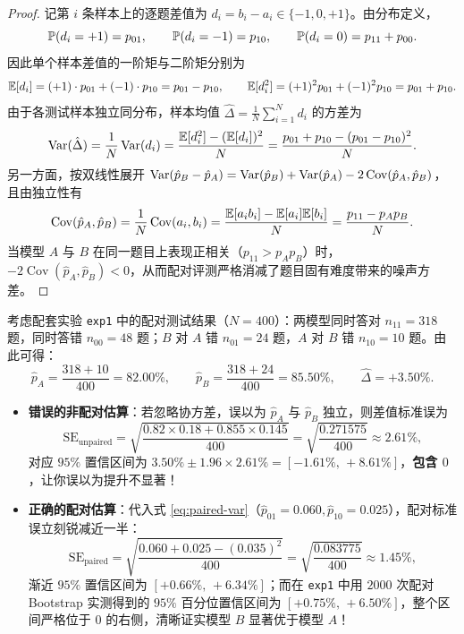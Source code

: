 \begin{proof}
记第 $i$ 条样本上的逐题差值为 $d_i = b_i - a_i \in \{-1, 0, +1\}$。由分布定义，
\[
  \mathbb{P}(d_i = +1) = p_{01}, \qquad \mathbb{P}(d_i = -1) = p_{10}, \qquad \mathbb{P}(d_i = 0) = p_{11} + p_{00}.
\]
因此单个样本差值的一阶矩与二阶矩分别为
\[
  \mathbb{E}[d_i] = (+1)\cdot p_{01} + (-1)\cdot p_{10} = p_{01} - p_{10}, \qquad
  \mathbb{E}[d_i^2] = (+1)^2 p_{01} + (-1)^2 p_{10} = p_{01} + p_{10}.
\]
由于各测试样本独立同分布，样本均值 $\hat{\Delta} = \frac{1}{N}\sum_{i=1}^N d_i$ 的方差为
\[
  \operatorname{Var}(\hat{\Delta}) = \frac{1}{N}\operatorname{Var}(d_i) = \frac{\mathbb{E}[d_i^2] - (\mathbb{E}[d_i])^2}{N} = \frac{p_{01} + p_{10} - (p_{01} - p_{10})^2}{N}.
\]
另一方面，按双线性展开 $\operatorname{Var}(\hat{p}_B - \hat{p}_A) = \operatorname{Var}(\hat{p}_B) + \operatorname{Var}(\hat{p}_A) - 2\operatorname{Cov}(\hat{p}_A, \hat{p}_B)$，且由独立性有
\[
  \operatorname{Cov}(\hat{p}_A, \hat{p}_B)
  = \frac{1}{N}\operatorname{Cov}(a_i, b_i)
  = \frac{\mathbb{E}[a_i b_i] - \mathbb{E}[a_i]\mathbb{E}[b_i]}{N}
  = \frac{p_{11} - p_A p_B}{N}.
\]
当模型 $A$ 与 $B$ 在同一题目上表现正相关（$p_{11} > p_A p_B$）时，$-2\operatorname{Cov}(\hat{p}_A,\hat{p}_B) < 0$，从而配对评测严格消减了题目固有难度带来的噪声方差。
\end{proof}

\begin{example}[非配对误差棒为何会误杀真实提升？]\label{ex:paired-vs-unpaired}
考虑配套实验 \texttt{exp1} 中的配对测试结果（$N=400$）：两模型同时答对 $n_{11}=318$ 题，同时答错 $n_{00}=48$ 题；$B$ 对 $A$ 错 $n_{01}=24$ 题，$A$ 对 $B$ 错 $n_{10}=10$ 题。由此可得：
\[
  \hat{p}_A = \frac{318 + 10}{400} = 82.00\%, \qquad
  \hat{p}_B = \frac{318 + 24}{400} = 85.50\%, \qquad
  \hat{\Delta} = +3.50\%.
\]
\begin{itemize}
  \item \textbf{错误的非配对估算}：若忽略协方差，误以为 $\hat{p}_A$ 与 $\hat{p}_B$ 独立，则差值标准误为
  \[
    \mathrm{SE}_{\text{unpaired}} = \sqrt{\frac{0.82\times 0.18 + 0.855\times 0.145}{400}} = \sqrt{\frac{0.271575}{400}} \approx 2.61\%,
  \]
  对应 $95\%$ 置信区间为 $3.50\% \pm 1.96 \times 2.61\% = [-1.61\%,\, +8.61\%]$，\textbf{包含 $0$}，让你误以为提升不显著！
  \item \textbf{正确的配对估算}：代入式 \eqref{eq:paired-var}（$\hat{p}_{01}=0.060, \hat{p}_{10}=0.025$），配对标准误立刻锐减近一半：
  \[
    \mathrm{SE}_{\text{paired}} = \sqrt{\frac{0.060 + 0.025 - (0.035)^2}{400}} = \sqrt{\frac{0.083775}{400}} \approx 1.45\%,
  \]
  渐近 $95\%$ 置信区间为 $[+0.66\%,\, +6.34\%]$；而在 \texttt{exp1} 中用 $2000$ 次配对 Bootstrap 实测得到的 $95\%$ 百分位置信区间为 \textbf{$[+0.75\%,\, +6.50\%]$}，整个区间严格位于 $0$ 的右侧，清晰证实模型 $B$ 显著优于模型 $A$！
\end{itemize}
\end{example}

